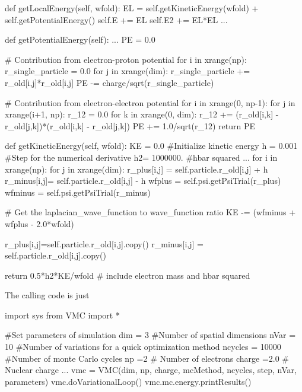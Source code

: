 \begin{Python}

  def getLocalEnergy(self, wfold):
	  EL 	   = self.getKineticEnergy(wfold) + self.getPotentialEnergy()
	  self.E  += EL
	  self.E2 += EL*EL 
  ...

  def getPotentialEnergy(self):
    ...
		PE = 0.0
		
    # Contribution from electron-proton potential
    for i in xrange(np):
      r_single_particle = 0.0
      for j in xrange(dim): 
				r_single_particle += r_old[i,j]*r_old[i,j]
    PE -= charge/sqrt(r_single_particle) 

    # Contribution from electron-electron potential
    for i in xrange(0, np-1):
      for j in xrange(i+1, np):
			r_12 = 0.0
			for k in xrange(0, dim):
				r_12 += (r_old[i,k] - r_old[j,k])*(r_old[i,k] - r_old[j,k])
			PE += 1.0/sqrt(r_12) 
    return PE

  def getKineticEnergy(self, wfold):
		KE = 0.0  		 	 	#Initialize kinetic energy
		h = 0.001		 		 	#Step for the numerical derivative
    h2= 1000000.	 		#hbar squared
    ...
    for i in xrange(np):
      for j in xrange(dim):
				r_plus[i,j] = self.particle.r_old[i,j] + h
				r_minus[i,j]= self.particle.r_old[i,j] - h
				wfplus  = self.psi.getPsiTrial(r_plus)
				wfminus = self.psi.getPsiTrial(r_minus)

				# Get the laplacian_wave_function to wave_function ratio
				KE -= (wfminus + wfplus - 2.0*wfold)
				
				r_plus[i,j]=self.particle.r_old[i,j].copy()
				r_minus[i,j]  = self.particle.r_old[i,j].copy()

  return 0.5*h2*KE/wfold # include electron mass and hbar squared
\end{Python}
The calling code is just
\begin{Python}
import sys
from VMC import *

#Set parameters of simulation
dim 	= 3	  						#Number of spatial dimensions
nVar 	= 10							#Number of variations for a quick optimization method
ncycles = 10000					#Number of monte Carlo cycles
np	=2						# Number of electrons
charge	=2.0		 	# Nuclear charge
...
vmc = VMC(dim, np, charge, mcMethod, ncycles, step, nVar, parameters)
vmc.doVariationalLoop()
vmc.mc.energy.printResults()
\end{Python}
